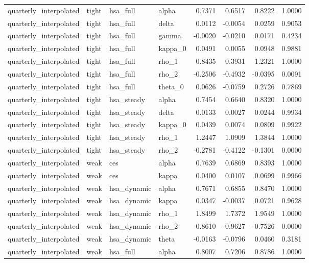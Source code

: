 \begin{tabular}{llllrrrr}
quarterly\_interpolated & tight & hsa\_full & alpha & 0.7371 & 0.6517 & 0.8222 & 1.0000 \\
quarterly\_interpolated & tight & hsa\_full & delta & 0.0112 & -0.0054 & 0.0259 & 0.9053 \\
quarterly\_interpolated & tight & hsa\_full & gamma & -0.0020 & -0.0210 & 0.0171 & 0.4234 \\
quarterly\_interpolated & tight & hsa\_full & kappa\_0 & 0.0491 & 0.0055 & 0.0948 & 0.9881 \\
quarterly\_interpolated & tight & hsa\_full & rho\_1 & 0.8435 & 0.3931 & 1.2321 & 1.0000 \\
quarterly\_interpolated & tight & hsa\_full & rho\_2 & -0.2506 & -0.4932 & -0.0395 & 0.0091 \\
quarterly\_interpolated & tight & hsa\_full & theta\_0 & 0.0626 & -0.0759 & 0.2726 & 0.7869 \\
quarterly\_interpolated & tight & hsa\_steady & alpha & 0.7454 & 0.6640 & 0.8320 & 1.0000 \\
quarterly\_interpolated & tight & hsa\_steady & delta & 0.0133 & 0.0027 & 0.0244 & 0.9934 \\
quarterly\_interpolated & tight & hsa\_steady & kappa\_0 & 0.0439 & 0.0074 & 0.0809 & 0.9922 \\
quarterly\_interpolated & tight & hsa\_steady & rho\_1 & 1.2447 & 1.0909 & 1.3844 & 1.0000 \\
quarterly\_interpolated & tight & hsa\_steady & rho\_2 & -0.2781 & -0.4122 & -0.1301 & 0.0000 \\
quarterly\_interpolated & weak & ces & alpha & 0.7639 & 0.6869 & 0.8393 & 1.0000 \\
quarterly\_interpolated & weak & ces & kappa & 0.0400 & 0.0107 & 0.0699 & 0.9966 \\
quarterly\_interpolated & weak & hsa\_dynamic & alpha & 0.7671 & 0.6855 & 0.8470 & 1.0000 \\
quarterly\_interpolated & weak & hsa\_dynamic & kappa & 0.0347 & -0.0037 & 0.0721 & 0.9628 \\
quarterly\_interpolated & weak & hsa\_dynamic & rho\_1 & 1.8499 & 1.7372 & 1.9549 & 1.0000 \\
quarterly\_interpolated & weak & hsa\_dynamic & rho\_2 & -0.8610 & -0.9627 & -0.7526 & 0.0000 \\
quarterly\_interpolated & weak & hsa\_dynamic & theta & -0.0163 & -0.0796 & 0.0460 & 0.3181 \\
quarterly\_interpolated & weak & hsa\_full & alpha & 0.8007 & 0.7206 & 0.8786 & 1.0000 \\

\end{tabular}
